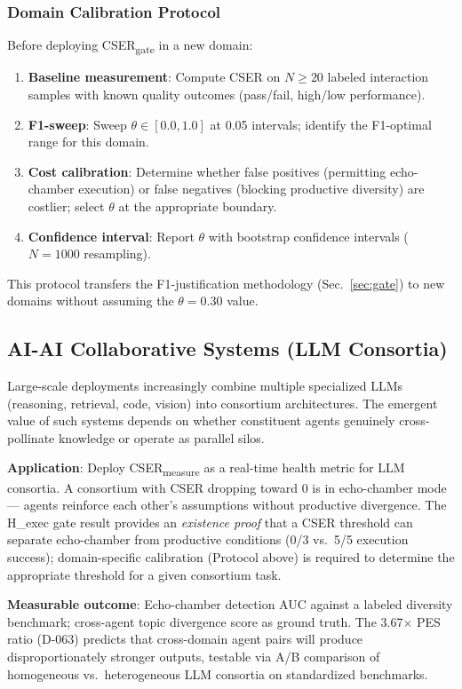 \documentclass[12pt]{article}
\begin{document}
\subsubsection*{Domain Calibration Protocol}
Before deploying CSER\textsubscript{gate} in a new domain:
\begin{enumerate}
  \item \textbf{Baseline measurement}: Compute CSER on $N \geq 20$ labeled interaction samples with known quality outcomes (pass/fail, high/low performance).
  \item \textbf{F1-sweep}: Sweep $\theta \in [0.0, 1.0]$ at 0.05 intervals; identify the F1-optimal range for this domain.
  \item \textbf{Cost calibration}: Determine whether false positives (permitting echo-chamber execution) or false negatives (blocking productive diversity) are costlier; select $\theta$ at the appropriate boundary.
  \item \textbf{Confidence interval}: Report $\theta$ with bootstrap confidence intervals ($N=1000$ resampling).
\end{enumerate}
This protocol transfers the F1-justification methodology (Sec.~\ref{sec:gate}) to new domains without assuming the $\theta=0.30$ value.

\subsection{AI-AI Collaborative Systems (LLM Consortia)}

Large-scale deployments increasingly combine multiple specialized LLMs (reasoning, retrieval, code, vision) into consortium architectures. The emergent value of such systems depends on whether constituent agents genuinely cross-pollinate knowledge or operate as parallel silos.

\textbf{Application}: Deploy CSER\textsubscript{measure} as a real-time health metric for LLM consortia. A consortium with CSER dropping toward 0 is in echo-chamber mode --- agents reinforce each other's assumptions without productive divergence. The H\_exec gate result provides an \emph{existence proof} that a CSER threshold can separate echo-chamber from productive conditions (0/3 vs.\ 5/5 execution success); domain-specific calibration (Protocol above) is required to determine the appropriate threshold for a given consortium task.

\textbf{Measurable outcome}: Echo-chamber detection AUC against a labeled diversity benchmark; cross-agent topic divergence score as ground truth. The 3.67$\times$ PES ratio (D-063) predicts that cross-domain agent pairs will produce disproportionately stronger outputs, testable via A/B comparison of homogeneous vs.\ heterogeneous LLM consortia on standardized benchmarks.
\end{document}
